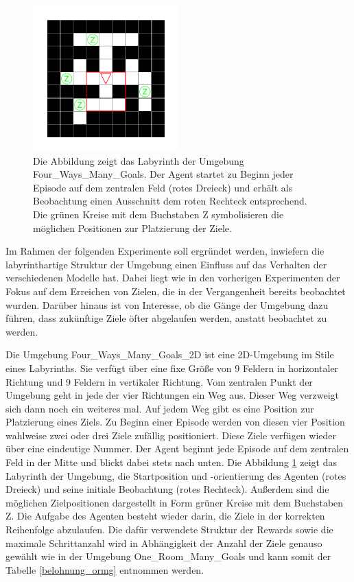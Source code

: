 \begin{figure}[ht!]
  \centering
  \includegraphics[keepaspectratio,width=0.5\textwidth]{abbildungen/fwmg.pdf}
  \caption{Die Abbildung zeigt das Labyrinth der Umgebung \glqq Four\_Ways\_Many\_Goals\grqq{}. Der Agent startet zu Beginn jeder Episode auf dem zentralen Feld (rotes Dreieck) und erhält als Beobachtung einen Ausschnitt dem roten Rechteck entsprechend. Die grünen Kreise mit dem Buchstaben Z symbolisieren die möglichen Positionen zur Platzierung der Ziele.}
  \label{fig_fwmg_ep_start}
\end{figure}


Im Rahmen der folgenden Experimente soll ergründet werden, inwiefern die labyrinthartige Struktur der Umgebung einen Einfluss auf das Verhalten der verschiedenen Modelle hat. Dabei liegt wie in den vorherigen Experimenten der Fokus auf dem Erreichen von Zielen, die in der Vergangenheit bereits beobachtet wurden. Darüber hinaus ist von Interesse, ob die Gänge der Umgebung dazu führen, dass zukünftige Ziele öfter abgelaufen werden, anstatt beobachtet zu werden.

Die Umgebung \glqq Four\_Ways\_Many\_Goals\_2D \grqq{} ist eine 2D-Umgebung im Stile eines Labyrinths. Sie verfügt über eine fixe Größe von 9 Feldern in horizontaler Richtung und 9 Feldern in vertikaler Richtung. Vom zentralen Punkt der Umgebung geht in jede der vier Richtungen ein Weg aus. Dieser Weg verzweigt sich dann noch ein weiteres mal. Auf jedem Weg gibt es eine Position zur Platzierung eines Ziels. Zu Beginn einer Episode werden von diesen vier Position wahlweise zwei oder drei Ziele zufällig positioniert. Diese Ziele verfügen wieder über eine eindeutige Nummer. Der Agent beginnt jede Episode auf dem zentralen Feld in der Mitte und blickt dabei stets nach unten. Die Abbildung \ref{fig_fwmg_ep_start} zeigt das Labyrinth der Umgebung, die Startposition und -orientierung des Agenten (rotes Dreieck) und seine initiale Beobachtung (rotes Rechteck). Außerdem sind die möglichen Zielpositionen dargestellt in Form grüner Kreise mit dem Buchstaben Z. Die Aufgabe des Agenten besteht wieder darin, die Ziele in der korrekten Reihenfolge abzulaufen. Die dafür verwendete Struktur der Rewards sowie die maximale Schrittanzahl wird in Abhängigkeit der Anzahl der Ziele genauso gewählt wie in der Umgebung \glqq One\_Room\_Many\_Goals\grqq{} und kann somit der Tabelle \ref{belohnung_ormg} entnommen werden.


